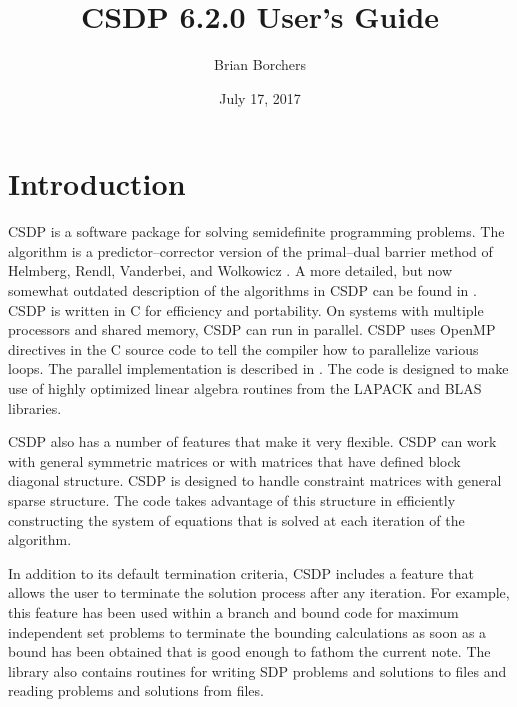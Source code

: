 \documentclass{article}
\begin{document}
%
%
%
%

\newcommand{\elprod}{\circ}

\title{CSDP 6.2.0 User's Guide}
\date{July 17, 2017}
\author{Brian Borchers}
\maketitle
\section*{Introduction}
CSDP is a software package for solving semidefinite programming
problems.  The algorithm is a predictor--corrector version of the
primal--dual barrier method of Helmberg, Rendl, Vanderbei, and
Wolkowicz \cite{HelmbergC:Anims}.  A more detailed, but now somewhat
outdated description of the algorithms in CSDP can be found in
\cite{BorchersB:CSDCls}.  CSDP is written in C for efficiency and
portability.  On systems with multiple processors and shared memory,
CSDP can run in parallel.  CSDP uses OpenMP directives in the C source
code to tell the compiler how to parallelize various loops.  The
parallel implementation is described in
\cite{borchers2007implementation}.  The code is designed to make use
of highly optimized linear algebra routines from the LAPACK and BLAS
libraries.

CSDP also has a number of features that make it very flexible.  CSDP
can work with general symmetric matrices or with matrices that have
defined block diagonal structure.  CSDP is designed to handle
constraint matrices with general sparse structure.  The code takes
advantage of this structure in efficiently constructing the system of
equations that is solved at each iteration of the algorithm.  

In addition to its default termination criteria, CSDP includes a
feature that allows the user to terminate the solution process after
any iteration.  For example, this feature has been used within a
branch and bound code for maximum independent set problems to
terminate the bounding calculations as soon as a bound has been
obtained that is good enough to fathom the current note.  The library
also contains routines for writing SDP problems and solutions to files
and reading problems and solutions from files.
\end{document}
